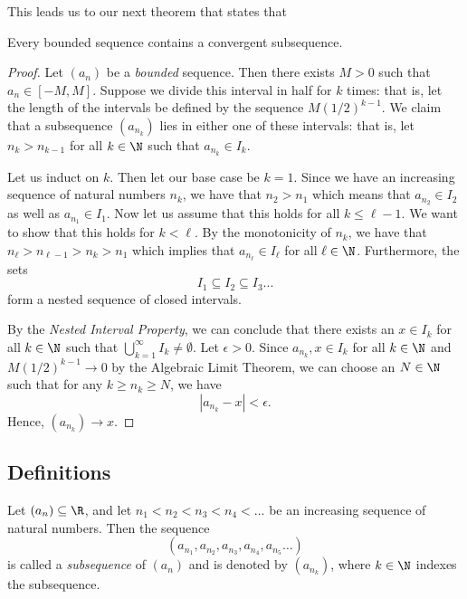 This leads us to our next theorem that states that
\begin{tcolorbox}
    \begin{thm}
        Every bounded sequence contains a convergent subsequence.
\end{thm}
\end{tcolorbox}

\begin{proof}
    Let \( (a_n)\) be a \textit{bounded} sequence. Then there exists \( M > 0 \) such that \( a_n \in [-M,M ]\). Suppose we divide this interval in half for \( k \) times: that is, let the length of the intervals be defined by the sequence \( M (1/2)^{k-1}\). We claim that a subsequence \( (a_{n_k})\) lies in either one of these intervals: that is, let \( n_{k} > n_{k-1}\) for all \( k \in \N \) such that \( a_{n_k} \in I_k\). 

    Let us induct on \( k\). Then let our base case be \( k = 1 \). Since we have an increasing sequence of natural numbers \( n_k\), we have that \( n_2 > n_1 \) which means that \( a_{n_2} \in I_2\) as well as \( a_{n_1} \in I_1\). Now let us assume that this holds for all \( k \leq \ell - 1 \). We want to show that this holds for \( k < \ell \). By the monotonicity of \( n_k \), we have that \( n_{\ell} > n_{\ell - 1} > n_k > n_1\) which implies that \( a_{n_\ell} \in I_\ell\) for all \( \ell \in \N \). Furthermore, the sets 
    \[ I_1 \subseteq I_2 \subseteq I_3 ...\]
form a nested sequence of closed intervals.

    By the \textit{Nested Interval Property}, we can conclude that there exists an \( x \in I_k\) for all \( k \in \N \)  such that \( \bigcup_{k=1}^{ \infty} I_k \neq \emptyset\). Let \( \epsilon > 0  \). Since \( a_{n_k}, x \in I_k \) for all \( k \in \N \) and \( M (1/2)^{k-1} \to 0\) by the Algebraic Limit Theorem, we can choose an \( N \in \N \) such that for any \( k \geq n_k \geq N \), we have
    \[ |a_{n_k} - x | < \epsilon.\] 
    Hence, \( (a_{n_k}) \to x \).
\end{proof}



\subsection{Definitions}


\begin{tcolorbox}
\begin{defn}
Let \( (a_n) \subseteq \R \), and let \( n_1 < n_2 < n_3 < n_4 < \dots\) be an increasing sequence of natural numbers. Then the sequence 
\[ (a_{n_1}, a_{n_2}, a_{n_3}, a_{n_4}, a_{n_5} \dots)\]
is called a \textit{subsequence} of \( (a_n)\) and is denoted by \( (a_{n_k})\), where \( k \in \N \) indexes the subsequence.
\end{defn}
\end{tcolorbox} 


